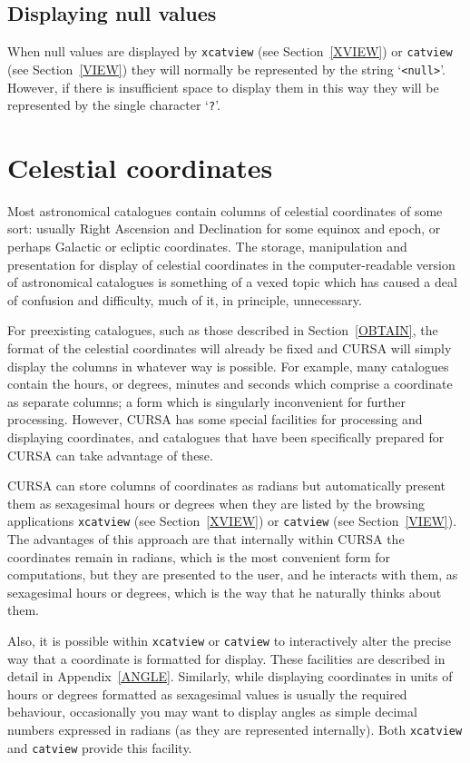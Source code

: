 \documentclass[twoside,11pt]{starlink}
\begin{document}
\subsection{Displaying null values}

When null values are displayed by \texttt{xcatview} (see
Section~\ref{XVIEW}) or \texttt{catview} (see Section~\ref{VIEW}) they
will normally be represented by the string `\texttt{<null>}'. However, if
there is insufficient space to display them in this way they will be
represented by the single character `\texttt{?}'.


\section{\label{CELCOORD}Celestial coordinates}

Most astronomical catalogues contain columns of celestial
coordinates of some sort: usually Right Ascension and
Declination for some equinox and epoch, or perhaps Galactic or
ecliptic coordinates. The storage, manipulation and presentation
for display of celestial coordinates in the computer-readable
version of astronomical catalogues is something of a vexed topic
which has caused a deal of confusion and difficulty, much of it,
in principle, unnecessary.

For preexisting catalogues, such as those described in
Section~\ref{OBTAIN}, the format of the celestial
coordinates will already be fixed and CURSA will simply display the
columns in whatever way is possible. For example, many catalogues
contain the hours, or degrees, minutes and seconds which
comprise a coordinate as separate columns; a form which is
singularly inconvenient for further processing. However, CURSA has
some special facilities for processing and displaying coordinates, and
catalogues that have been specifically prepared for CURSA can take
advantage of these.

CURSA can store columns of coordinates as radians but automatically
present them as sexagesimal hours or degrees when they are listed by the
browsing applications \texttt{xcatview} (see Section~\ref{XVIEW}) or \texttt{catview} (see Section~\ref{VIEW}). The advantages of this approach are
that internally within CURSA the coordinates remain in radians, which is
the most convenient form for computations, but they are presented to the
user, and he interacts with them, as sexagesimal hours or degrees, which
is the way that he naturally thinks about them.

Also, it is possible within \texttt{xcatview} or \texttt{catview} to
interactively alter the precise way that a coordinate is formatted for
display. These facilities are described in detail in
Appendix~\ref{ANGLE}. Similarly, while displaying coordinates in units of
hours or degrees formatted as sexagesimal values is usually the required
behaviour, occasionally you may want to display angles as simple decimal
numbers expressed in radians (as they are represented internally). Both
\texttt{xcatview} and \texttt{catview} provide this facility.
\end{document}
